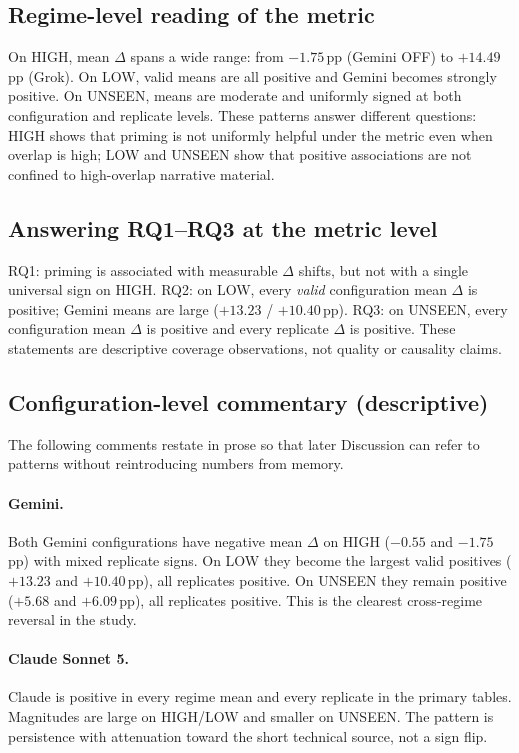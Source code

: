 \subsection{Regime-level reading of the metric}
On HIGH, mean $\Delta$ spans a wide range: from $-1.75$\,pp (Gemini OFF) to $+14.49$\,pp (Grok).
On LOW, valid means are all positive and Gemini becomes strongly positive.
On UNSEEN, means are moderate and uniformly signed at both configuration and replicate levels.
These patterns answer different questions: HIGH shows that priming is not uniformly helpful under the metric even when overlap is high; LOW and UNSEEN show that positive associations are not confined to high-overlap narrative material.

\subsection{Answering RQ1--RQ3 at the metric level}
RQ1: priming is associated with measurable $\Delta$ shifts, but not with a single universal sign on HIGH.
RQ2: on LOW, every \emph{valid} configuration mean $\Delta$ is positive; Gemini means are large ($+13.23$ / $+10.40$\,pp).
RQ3: on UNSEEN, every configuration mean $\Delta$ is positive and every replicate $\Delta$ is positive.
These statements are descriptive coverage observations, not quality or causality claims.


\subsection{Configuration-level commentary (descriptive)}
The following comments restate  in prose so that later Discussion can refer to patterns without reintroducing numbers from memory.

\paragraph{Gemini.}
Both Gemini configurations have negative mean $\Delta$ on HIGH ($-0.55$ and $-1.75$\,pp) with mixed replicate signs.
On LOW they become the largest valid positives ($+13.23$ and $+10.40$\,pp), all replicates positive.
On UNSEEN they remain positive ($+5.68$ and $+6.09$\,pp), all replicates positive.
This is the clearest cross-regime reversal in the study.

\paragraph{Claude Sonnet 5.}
Claude is positive in every regime mean and every replicate in the primary tables.
Magnitudes are large on HIGH/LOW and smaller on UNSEEN.
The pattern is persistence with attenuation toward the short technical source, not a sign flip.

